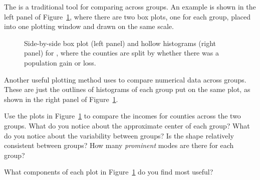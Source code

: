 \D{\newpage}

The 
is a traditional tool for comparing across groups.
An example is shown in the left panel of
Figure~\ref{countyIncomeSplitByPopGain},
where there are two box plots, one for each group,
placed into one plotting window and drawn on the same scale.

\begin{figure}
  \centering
  \caption{Side-by-side box plot (left panel)
      and hollow histograms (right panel) for
      ,
      where the counties are split by whether there was
      a population gain or loss.}
  \label{countyIncomeSplitByPopGain}
\end{figure}

Another useful plotting method uses  to compare numerical data across groups. These are just the outlines of histograms of each group put on the same plot, as shown in the right panel of Figure~\ref{countyIncomeSplitByPopGain}.

\begin{exercisewrap}
\begin{nexercise} \label{comparingPriceByTypeExercise}
Use the plots in Figure~\ref{countyIncomeSplitByPopGain}
to compare the incomes for counties across the two groups.
What do you notice about the approximate center of each group?
What do you notice about the variability between groups?
Is the shape relatively consistent between groups?
How many \emph{prominent} modes are there for each
group?\footnotemark{}
\end{nexercise}
\end{exercisewrap}

\begin{exercisewrap}
\begin{nexercise}
What components of each plot in
Figure~\ref{countyIncomeSplitByPopGain}
do you find most useful?\footnotemark{}
\end{nexercise}
\end{exercisewrap}



